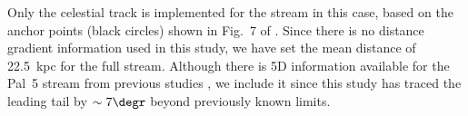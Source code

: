 Only the celestial track is implemented for the stream in this case, based on the anchor points (black circles) shown in Fig.~7 of \citet{Starkman2020}. Since there is no distance gradient information used in this study, we have set the mean distance of 22.5~kpc for the full stream. Although there is 5D information available for the Pal~5 stream from previous studies \citep{PriceWhelan2019_pal5,Ibata2021}, we include it since this study has traced the leading tail by $\sim7\degr$ beyond previously known limits.
